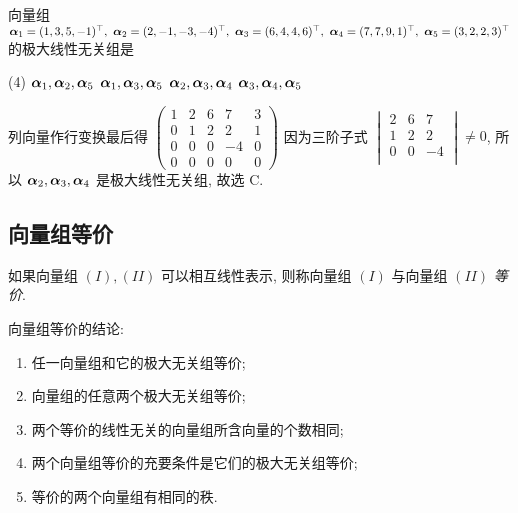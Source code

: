 \begin{example}
    向量组 $\vb*{\alpha}_1=(1,3,5,-1)^\top,~\vb*{\alpha}_2=(2,-1,-3,-4)^\top,~\vb*{\alpha}_3=(6,4,4,6)^\top,~\vb*{\alpha}_4=(7,7,9,1)^\top,~\vb*{\alpha}_5=(3,2,2,3)^\top$ 的极大线性无关组是 
    \begin{tasks}(4)
        \task $\vb*{\alpha}_1,\vb*{\alpha}_2,\vb*{\alpha}_5$
        \task $\vb*{\alpha}_1,\vb*{\alpha}_3,\vb*{\alpha}_5$
        \task $\vb*{\alpha}_2,\vb*{\alpha}_3,\vb*{\alpha}_4$
        \task $\vb*{\alpha}_3,\vb*{\alpha}_4,\vb*{\alpha}_5$
    \end{tasks}
\end{example}
\begin{solution}
    列向量作行变换最后得 $\begin{pmatrix} 1 & 2 & 6 & 7 & 3 \\ 0 & 1 & 2 & 2 & 1 \\ 0 & 0 & 0 & -4 & 0 \\ 0 & 0 & 0 & 0 & 0\end{pmatrix}$
    因为三阶子式 $\begin{vmatrix} 2 & 6 & 7 \\ 1 & 2 & 2 \\ 0 & 0 & -4 \\\end{vmatrix}\neq0$, 所以 $\vb*{\alpha}_2,\vb*{\alpha}_3,\vb*{\alpha}_4$ 是极大线性无关组, 故选 C.
\end{solution}

\subsection{向量组等价}

\begin{definition}[向量组等价]
    如果向量组 $(I),(II)$ 可以相互线性表示, 则称向量组 $(I)$ 与向量组 $(II)$ \textit{等价}.
\end{definition}

向量组等价的结论:
\begin{enumerate}[label=(\arabic{*})]
    \item 任一向量组和它的极大无关组等价;
    \item 向量组的任意两个极大无关组等价;
    \item 两个等价的线性无关的向量组所含向量的个数相同;
    \item 两个向量组等价的充要条件是它们的极大无关组等价;
    \item 等价的两个向量组有相同的秩.
\end{enumerate}

